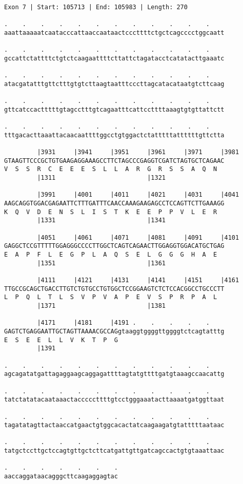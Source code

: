 \documentclass{article}
\begin{document}
\begin{Verbatim}
Exon 7 | Start: 105713 | End: 105983 | Length: 270
 
.    .    .    .    .    .    .    .    .    .    .    .    
aaattaaaaatcaatacccattaaccaataactcccttttctgctcagcccctggcaatt
  
.    .    .    .    .    .    .    .    .    .    .    .    
gccattctattttctgtctcaagaattttcttattctagatacctcatatacttgaaatc
  
.    .    .    .    .    .    .    .    .    .    .    .    
atacgatatttgttctttgtgtcttaagtaatttcccttagcatacataatgtcttcaag
  
.    .    .    .    .    .    .    .    .    .    .    .    
gttcatccactttttgtagcctttgtcagaatttcattccttttaaagtgtgttattctt
  
.    .    .    .    .    .    .    .    .    .    .    .    
tttgacacttaaattacaacaattttggcctgtggactctatttttattttttgttctta
  
         |3931     |3941     |3951     |3961     |3971     |3981
GTAAGTTCCCGCTGTGAAGAGGAAAGCCTTCTAGCCCGAGGTCGATCTAGTGCTCAGAAC
V  S  S  R  C  E  E  E  S  L  L  A  R  G  R  S  S  A  Q  N  
         |1311                         |1321                
  
         |3991     |4001     |4011     |4021     |4031     |4041
AAGCAGGTGGACGAGAATTCTTTGATTTCAACCAAAGAAGAGCCTCCAGTTCTTGAAAGG
K  Q  V  D  E  N  S  L  I  S  T  K  E  E  P  P  V  L  E  R  
         |1331                         |1341                
  
         |4051     |4061     |4071     |4081     |4091     |4101
GAGGCTCCGTTTTTGGAGGGCCCCTTGGCTCAGTCAGAACTTGGAGGTGGACATGCTGAG
E  A  P  F  L  E  G  P  L  A  Q  S  E  L  G  G  G  H  A  E  
         |1351                         |1361                
  
         |4111     |4121     |4131     |4141     |4151     |4161
TTGCCGCAGCTGACCTTGTCTGTGCCTGTGGCTCCGGAAGTCTCTCCACGGCCTGCCCTT
L  P  Q  L  T  L  S  V  P  V  A  P  E  V  S  P  R  P  A  L  
         |1371                         |1381                
  
         |4171     |4181     |4191 .    .    .    .    .    
GAGTCTGAGGAATTGCTAGTTAAAACGCCAGgtaaggtggggttggggtctcagtatttg
E  S  E  E  L  L  V  K  T  P  G                             
         |1391                                              
  
.    .    .    .    .    .    .    .    .    .    .    .    
agcagatatgattagaggaagcaggagattttagtatgttttgatgtaaagccaacattg
  
.    .    .    .    .    .    .    .    .    .    .    .    
tatctatatacaataaactacccccttttgtcctgggaaatacttaaaatgatggttaat
  
.    .    .    .    .    .    .    .    .    .    .    .    
tagatatagttactaaccatgaactgtggcacactatcaagaagatgtatttttaataac
  
.    .    .    .    .    .    .    .    .    .    .    .    
tatgctccttgctccagtgttgctcttcatgattgttgatcagccactgtgtaaattaac
  
.    .    .    .    .    .    .
aaccaggataacagggcttcaagaggagtac
\end{Verbatim}
\end{document}
